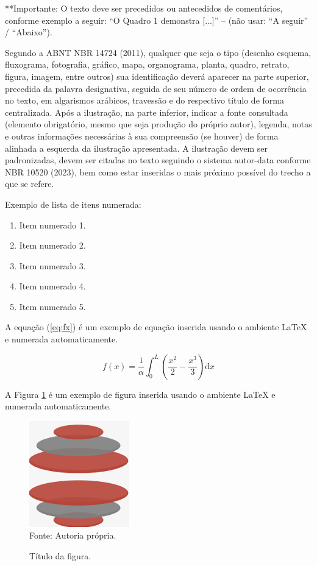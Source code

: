 \documentclass[
article,			%
11pt,				%
twoside,			%
a4paper,			%
section=TITLE,		%
onecolumn,          %
english,			%
brazil,				%
sumario=tradicional
]{abntex2}
\begin{document}
**Importante: O texto deve ser precedidos ou antecedidos de comentários, conforme exemplo a seguir: “O Quadro 1 demonstra [...]” – (não usar: “A seguir” / “Abaixo”).

Segundo a ABNT NBR 14724 (2011), qualquer que seja o tipo (desenho esquema, fluxograma, fotografia, gráfico, mapa, organograma, planta, quadro, retrato, figura, imagem, entre outros) sua identificação deverá aparecer na parte superior, precedida da palavra designativa, seguida de seu número de ordem de ocorrência no texto, em algarismos arábicos, travessão e do respectivo título de forma centralizada. Após a ilustração, na parte inferior, indicar a fonte consultada (elemento obrigatório, mesmo que seja produção do próprio autor), legenda, notas e outras informações necessárias à sua compreensão (se houver) de forma alinhada a esquerda da ilustração apresentada. A ilustração devem ser padronizadas, devem ser citadas no texto seguindo o sistema autor-data conforme NBR 10520 (2023), bem como estar inseridas o mais próximo possível do trecho a que se refere.

Exemplo de lista de itens numerada:
\begin{enumerate}
\item Item numerado 1.
\item Item numerado 2.
\item Item numerado 3.
\item Item numerado 4.
\item Item numerado 5.
\end{enumerate}

A equação (\ref{eq:fx}) é um exemplo de equação inserida usando o ambiente LaTeX e numerada automaticamente.

\begin{equation}
\label{eq:fx}
f(x) = \frac{1}{\alpha} \int_0^L \left(\frac{x^2}{2} -\frac{x^3}{3}\right) \mathrm{d} x
\end{equation}


A Figura \ref{fig1} é um exemplo de figura inserida usando o ambiente LaTeX e numerada automaticamente.

\begin{figure}[!htb]
\centering%
\caption{Título da figura.}%
\label{fig1}
\includegraphics[width = 0.5\columnwidth]{figuras/Imagem1.png}
\\Fonte: Autoria própria.
\end{figure}
\end{document}
